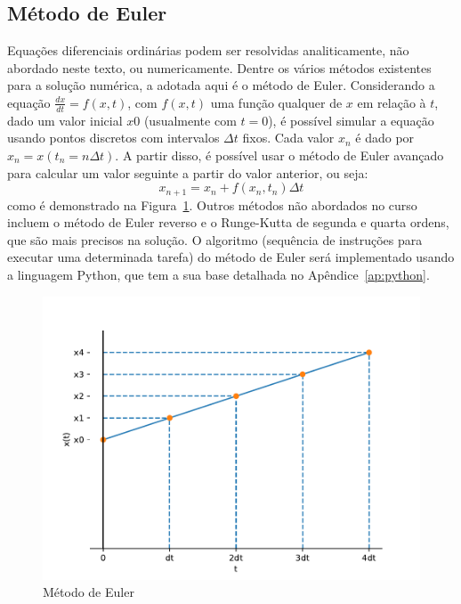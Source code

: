 \subsection{Método de Euler}
Equações diferenciais ordinárias podem ser resolvidas analiticamente, não abordado neste texto, ou numericamente. Dentre os vários métodos existentes para a solução numérica, a adotada aqui é o método de Euler. Considerando a equação $\frac{dx}{dt}=f(x,t)$, com $f(x,t)$ uma função qualquer de $x$ em relação à $t$, dado um valor inicial $x0$ (usualmente com $t=0$), é possível simular a equação usando pontos discretos com intervalos $\Delta t$ fixos. Cada valor $x_n$ é dado por $x_n=x(t_n=n\Delta t)$. A partir disso, é possível usar o método de Euler avançado para calcular um valor seguinte a partir do valor anterior, ou seja:
$$
x_{n+1}=x_n+f(x_n,t_n)\Delta t
$$
como é demonstrado na Figura~\ref{fig:euler}. Outros métodos não abordados no curso incluem o método de Euler reverso e o Runge-Kutta de segunda e quarta ordens, que são mais precisos na solução. O algoritmo (sequência de instruções para executar uma determinada tarefa) do método de Euler será implementado usando a linguagem Python, que tem a sua base detalhada no Apêndice~\ref{ap:python}.
\begin{figure}[tb]
	\centering
	\caption{Método de Euler}
	\label{fig:euler}
	\includegraphics[width=0.7\linewidth]{figs/euler}
\end{figure}


